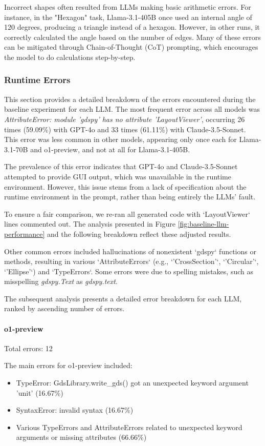 \documentclass{article}
\begin{document}
Incorrect shapes often resulted from LLMs making basic arithmetic errors. For instance, in the "Hexagon" task, Llama-3.1-405B once used an internal angle of 120 degrees, producing a triangle instead of a hexagon. However, in other runs, it correctly calculated the angle based on the number of edges. Many of these errors can be mitigated through Chain-of-Thought (CoT) prompting, which encourages the model to do calculations step-by-step.

\subsubsection{Runtime Errors}
\label{appendix:runtime_errors}

This section provides a detailed breakdown of the errors encountered during the baseline experiment for each LLM. The most frequent error across all models was \textit{AttributeError: module 'gdspy' has no attribute 'LayoutViewer'}, occurring 26 times (59.09\%) with GPT-4o and 33 times (61.11\%) with Claude-3.5-Sonnet. This error was less common in other models, appearing only once each for Llama-3.1-70B and o1-preview, and not at all for Llama-3.1-405B.

The prevalence of this error indicates that GPT-4o and Claude-3.5-Sonnet attempted to provide GUI output, which was unavailable in the runtime environment. However, this issue stems from a lack of specification about the runtime environment in the prompt, rather than being entirely the LLMs' fault.

To ensure a fair comparison, we re-ran all generated code with `LayoutViewer` lines commented out. The analysis presented in Figure \ref{fig:baseline-llm-performance} and the following breakdown reflect these adjusted results.

Other common errors included hallucinations of nonexistent `gdspy` functions or methods, resulting in various `AttributeErrors` (e.g., `'CrossSection'`, `'Circular'`, `'Ellipse'`) and `TypeErrors`. Some errors were due to spelling mistakes, such as misspelling \textit{gdspy.Text} as \textit{gdspy.text}.

The subsequent analysis presents a detailed error breakdown for each LLM, ranked by ascending number of errors.

\paragraph{o1-preview}
Total errors: 12

The main errors for o1-preview included:
\begin{itemize}
    \item TypeError: GdsLibrary.write\_gds() got an unexpected keyword argument 'unit' (16.67\%)
    \item SyntaxError: invalid syntax (16.67\%)
    \item Various TypeErrors and AttributeErrors related to unexpected keyword arguments or missing attributes (66.66\%)
\end{itemize}
\end{document}
